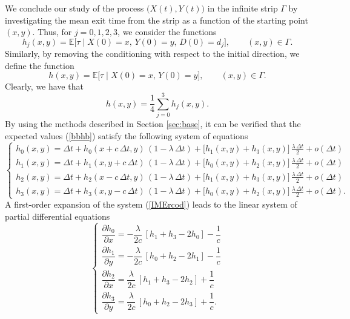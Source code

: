 \documentclass{article}
\begin{document}
We conclude our study of the process $\big(X(t),Y(t)\big)$ in the infinite strip $\Gamma$ by investigating the mean exit time from the strip as a function of the starting point $(x,y)$. Thus, for $j=0,1,2,3$, we consider the functions
\begin{equation}\label{bbhb}h_j(x,y)=\mathbb{E}\Big[\tau\;\Big\lvert\;X(0)=x,\,Y(0)=y,\,D(0)=d_j\Big],\qquad (x,y)\in\Gamma.\end{equation}
Similarly, by removing the conditioning with respect to the initial direction, we define the function
$$h(x,y)=\mathbb{E}\Big[\tau\;\Big\lvert\;X(0)=x,\,Y(0)=y\Big],\qquad (x,y)\in\Gamma.$$
Clearly, we have that 
\begin{equation}h(x,y)=\frac{1}{4}\sum_{j=0}^3 h_j(x,y).\label{unchg}\end{equation}
By using the methods described in Section \ref{sec:base}, it can be verified that the expected values (\ref{bbhb}) satisfy the following system of equations
\begin{equation}\label{IMErcod}
\begin{cases}
h_0(x,y)=\Delta t+h_0(x+c\,\Delta t,y)\,(1-\lambda\,\Delta t)+\big[h_1(x,y)+h_3(x,y)\big]\,\frac{\lambda\,\Delta t}{2} + o(\Delta t)\\[0.35em]
h_1(x,y)=\Delta t+h_1(x,y+c\,\Delta t)\,(1-\lambda\,\Delta t)+\big[h_0(x,y)+h_2(x,y)\big]\,\frac{\lambda\,\Delta t}{2} + o(\Delta t)\\[0.35em]
h_2(x,y)=\Delta t+h_2(x-c\,\Delta t,y)\,(1-\lambda\,\Delta t)+\big[h_1(x,y)+h_3(x,y)\big]\,\frac{\lambda\,\Delta t}{2} + o(\Delta t)\\[0.35em]
h_3(x,y)=\Delta t+h_3(x,y-c\,\Delta t)\,(1-\lambda\,\Delta t)+\big[h_0(x,y)+h_2(x,y)\big]\,\frac{\lambda\,\Delta t}{2} + o(\Delta t).
\end{cases}\end{equation}
A first-order expansion of the system (\ref{IMErcod}) leads to the linear system of partial differential equations
\begin{equation}\label{bivhjdsys}
\begin{cases}
\dfrac{\partial h_0}{\partial x}=-\dfrac{\lambda}{2c}\,\left[h_1+h_3-2h_0\right]-\dfrac{1}{c}\\[0.75em]
\dfrac{\partial h_1}{\partial y}=-\dfrac{\lambda}{2c}\,\left[h_0+h_2-2h_1\right]-\dfrac{1}{c}\\[0.75em]
\dfrac{\partial h_2}{\partial x}=\dfrac{\lambda}{2c}\,\left[h_1+h_3-2h_2\right]+\dfrac{1}{c}\\[0.75em]
\dfrac{\partial h_3}{\partial y}=\dfrac{\lambda}{2c}\,\left[h_0+h_2-2h_3\right]+\dfrac{1}{c}.
\end{cases}\end{equation}
\end{document}
